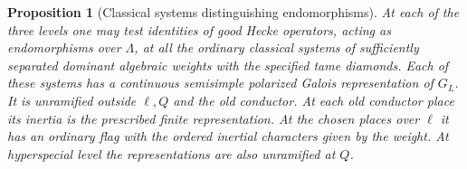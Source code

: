 \documentclass[a4paper,11pt]{article}
\newtheorem{proposition}{Proposition}[section]
\theoremstyle{definition}
\theoremstyle{remark}
\numberwithin{equation}{section}
\begin{document}
\begin{proposition}[Classical systems distinguishing endomorphisms]\leavevmode
\label{prop:ordinaryclass405}
At each of the three levels one may test identities of good
Hecke operators, acting as endomorphisms over \(\Lambda\), at
all the ordinary classical systems of sufficiently separated
dominant algebraic weights with the specified tame diamonds.
Each of these systems has a continuous semisimple polarized
Galois representation of \(G_L\). It is unramified outside
\(\ell,Q\) and the old conductor. At each old conductor place
its inertia is the prescribed finite representation. At
the chosen places over \(\ell\) it has an ordinary flag with
the ordered inertial characters given by the weight.
At hyperspecial level the representations are also unramified
at \(Q\).
\end{proposition}
\end{document}

